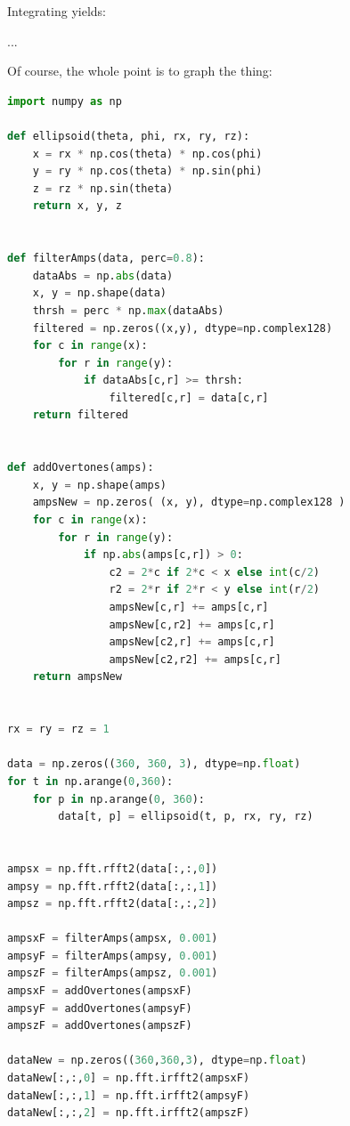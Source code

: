                     
Integrating yields:

...

Of course, the whole point is to graph the thing: 

\begin{lstlisting}[language=python]
import numpy as np

def ellipsoid(theta, phi, rx, ry, rz):
    x = rx * np.cos(theta) * np.cos(phi)
    y = ry * np.cos(theta) * np.sin(phi)
    z = rz * np.sin(theta)
    return x, y, z


def filterAmps(data, perc=0.8):
    dataAbs = np.abs(data)
    x, y = np.shape(data)
    thrsh = perc * np.max(dataAbs)
    filtered = np.zeros((x,y), dtype=np.complex128)
    for c in range(x):
        for r in range(y):
            if dataAbs[c,r] >= thrsh:
                filtered[c,r] = data[c,r]
    return filtered


def addOvertones(amps):
    x, y = np.shape(amps)
    ampsNew = np.zeros( (x, y), dtype=np.complex128 )
    for c in range(x): 
        for r in range(y):
            if np.abs(amps[c,r]) > 0:
                c2 = 2*c if 2*c < x else int(c/2)
                r2 = 2*r if 2*r < y else int(r/2)
                ampsNew[c,r] += amps[c,r]
                ampsNew[c,r2] += amps[c,r]
                ampsNew[c2,r] += amps[c,r]
                ampsNew[c2,r2] += amps[c,r]
    return ampsNew


rx = ry = rz = 1

data = np.zeros((360, 360, 3), dtype=np.float)
for t in np.arange(0,360):
    for p in np.arange(0, 360):
        data[t, p] = ellipsoid(t, p, rx, ry, rz)


ampsx = np.fft.rfft2(data[:,:,0])
ampsy = np.fft.rfft2(data[:,:,1])
ampsz = np.fft.rfft2(data[:,:,2])

ampsxF = filterAmps(ampsx, 0.001)
ampsyF = filterAmps(ampsy, 0.001)
ampszF = filterAmps(ampsz, 0.001)
ampsxF = addOvertones(ampsxF)
ampsyF = addOvertones(ampsyF)
ampszF = addOvertones(ampszF)

dataNew = np.zeros((360,360,3), dtype=np.float)
dataNew[:,:,0] = np.fft.irfft2(ampsxF)
dataNew[:,:,1] = np.fft.irfft2(ampsyF)
dataNew[:,:,2] = np.fft.irfft2(ampszF)
\end{lstlisting}


